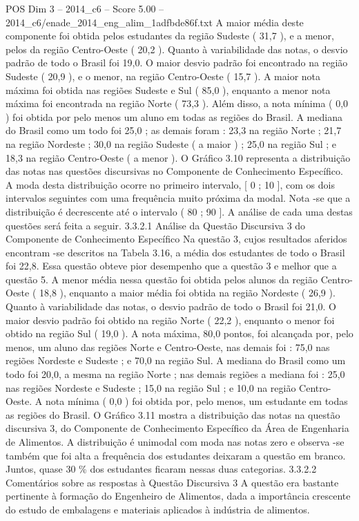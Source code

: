 \begin{textsample}{POS Dim 3 – 2014\_c6 – Score 5.00 – 2014\_c6/enade\_2014\_eng\_alim\_1adfbde86f.txt}
A maior média deste componente foi obtida pelos estudantes da região Sudeste ( 31,7 ), e a menor, pelos da região Centro-Oeste ( 20,2 ).
Quanto à variabilidade das notas, o desvio padrão de todo o Brasil foi 19,0.
O maior desvio padrão foi encontrado na região Sudeste ( 20,9 ), e o menor, na região Centro-Oeste ( 15,7 ).
A maior nota máxima foi obtida nas regiões Sudeste e Sul ( 85,0 ), enquanto a menor nota máxima foi encontrada na região Norte ( 73,3 ).
Além disso, a nota mínima ( 0,0 ) foi obtida por pelo menos um aluno em todas as regiões do Brasil.
A mediana do Brasil como um todo foi 25,0 ; as demais foram : 23,3 na região Norte ; 21,7 na região Nordeste ; 30,0 na região Sudeste ( a maior ) ; 25,0 na região Sul ; e 18,3 na região Centro-Oeste ( a menor ).
O Gráfico 3.10 representa a distribuição das notas nas questões discursivas no Componente de Conhecimento Específico.
A moda desta distribuição ocorre no primeiro intervalo, [ 0 ; 10 ], com os dois intervalos seguintes com uma frequência muito próxima da modal.
Nota -se que a distribuição é decrescente até o intervalo ( 80 ; 90 ].
A análise de cada uma destas questões será feita a seguir. 3.3.2.1 Análise da Questão Discursiva 3 do Componente de Conhecimento Específico Na questão 3, cujos resultados aferidos encontram -se descritos na Tabela 3.16, a média dos estudantes de todo o Brasil foi 22,8.
Essa questão obteve pior desempenho que a questão 3 e melhor que a questão 5.
A menor média nessa questão foi obtida pelos alunos da região Centro-Oeste ( 18,8 ), enquanto a maior média foi obtida na região Nordeste ( 26,9 ).
Quanto à variabilidade das notas, o desvio padrão de todo o Brasil foi 21,0.
O maior desvio padrão foi obtido na região Norte ( 22,2 ), enquanto o menor foi obtido na região Sul ( 19,0 ).
A nota máxima, 80,0 pontos, foi alcançada por, pelo menos, um aluno das regiões Norte e Centro-Oeste, nas demais foi : 75,0 nas regiões Nordeste e Sudeste ; e 70,0 na região Sul.
A mediana do Brasil como um todo foi 20,0, a mesma na região Norte ; nas demais regiões a mediana foi : 25,0 nas regiões Nordeste e Sudeste ; 15,0 na região Sul ; e 10,0 na região Centro-Oeste.
A nota mínima ( 0,0 ) foi obtida por, pelo menos, um estudante em todas as regiões do Brasil.
O Gráfico 3.11 mostra a distribuição das notas na questão discursiva 3, do Componente de Conhecimento Específico da Área de Engenharia de Alimentos.
A distribuição é unimodal com moda nas notas zero e observa -se também que foi alta a frequência dos estudantes deixaram a questão em branco.
Juntos, quase 30 \% dos estudantes ficaram nessas duas categorias. 3.3.2.2 Comentários sobre as respostas à Questão Discursiva 3 A questão era bastante pertinente à formação do Engenheiro de Alimentos, dada a importância crescente do estudo de embalagens e materiais aplicados à indústria de alimentos.

\end{textsample}
